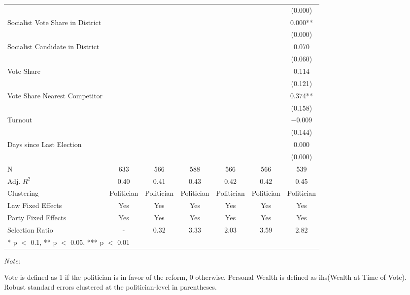 \begin{table}[!h]
{\begin{threeparttable}
\begin{tabular}[t]{lcccccc}
 &  &  &  &  &  & \vphantom{2} (\num{0.000})\\
Socialist Vote Share in District &  &  &  &  &  & \num{0.000}**\\
 &  &  &  &  &  & \vphantom{1} (\num{0.000})\\
Socialist Candidate in District &  &  &  &  &  & \num{0.070}\\
 &  &  &  &  &  & (\num{0.060})\\
Vote Share &  &  &  &  &  & \num{0.114}\\
 &  &  &  &  &  & (\num{0.121})\\
Vote Share Nearest Competitor &  &  &  &  &  & \num{0.374}**\\
 &  &  &  &  &  & (\num{0.158})\\
Turnout &  &  &  &  &  & \num{-0.009}\\
 &  &  &  &  &  & (\num{0.144})\\
Days since Last Election &  &  &  &  &  & \num{0.000}\\
 &  &  &  &  &  & (\num{0.000})\\
\midrule
N & \num{633} & \num{566} & \num{588} & \num{566} & \num{566} & \num{539}\\
Adj. $R^2$ & \num{0.40} & \num{0.41} & \num{0.43} & \num{0.42} & \num{0.42} & \num{0.45}\\
Clustering & Politician & Politician & Politician & Politician & Politician & Politician\\
Law Fixed Effects & Yes & Yes & Yes & Yes & Yes & Yes\\
Party Fixed Effects & Yes & Yes & Yes & Yes & Yes & Yes\\
Selection Ratio & - & 0.32 & 3.33 & 2.03 & 3.59 & 2.82\\
\bottomrule
\multicolumn{7}{l}{\rule{0pt}{1em}* p $<$ 0.1, ** p $<$ 0.05, *** p $<$ 0.01}\\
\end{tabular}
\begin{tablenotes}[para]
\item \textit{Note:} 
\item Vote is defined as 1 if the politician is in favor of the reform, 0 otherwise. Personal Wealth is defined as ihs(Wealth at Time of Vote). Robust standard errors clustered at the politician-level in parentheses.
\end{tablenotes}
\end{threeparttable}}
\end{table}
